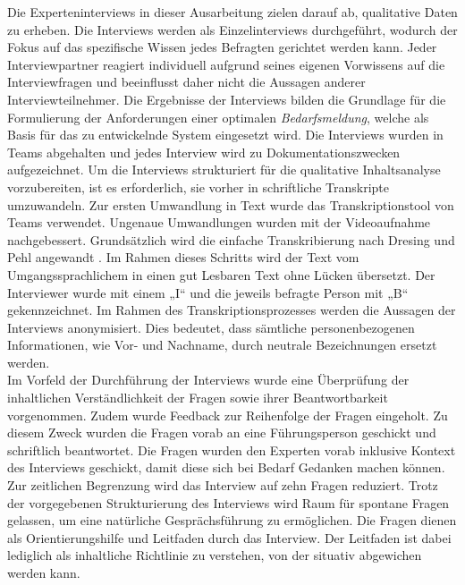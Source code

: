 Die Experteninterviews in dieser Ausarbeitung zielen darauf ab, qualitative Daten zu erheben. Die Interviews werden als Einzelinterviews durchgeführt, wodurch der Fokus auf das spezifische Wissen jedes Befragten gerichtet werden kann. Jeder Interviewpartner reagiert individuell aufgrund seines eigenen Vorwissens auf die Interviewfragen und beeinflusst daher nicht die Aussagen anderer Interviewteilnehmer. Die Ergebnisse der Interviews bilden die Grundlage für die Formulierung der Anforderungen einer optimalen \emph{Bedarfsmeldung}, welche als Basis für das zu entwickelnde System eingesetzt wird. Die Interviews wurden in Teams abgehalten und jedes Interview wird zu Dokumentationszwecken aufgezeichnet. Um die Interviews strukturiert für die qualitative Inhaltsanalyse vorzubereiten, ist es erforderlich, sie vorher in schriftliche Transkripte umzuwandeln. Zur ersten Umwandlung in Text wurde das Transkriptionstool von Teams verwendet. Ungenaue Umwandlungen wurden mit der Videoaufnahme nachgebessert. Grundsätzlich wird die einfache Transkribierung nach Dresing und Pehl angewandt \cite{dresing2015praxisbuch}. Im Rahmen dieses Schritts wird der Text vom Umgangssprachlichem in einen gut Lesbaren Text ohne Lücken übersetzt. Der Interviewer wurde mit einem „I“ und die jeweils befragte Person mit „B“ gekennzeichnet. Im Rahmen des Transkriptionsprozesses werden die Aussagen der Interviews anonymisiert. Dies bedeutet, dass sämtliche personenbezogenen Informationen, wie Vor- und Nachname, durch neutrale Bezeichnungen ersetzt werden.\\

Im Vorfeld der Durchführung der Interviews wurde eine Überprüfung der inhaltlichen Verständlichkeit der Fragen sowie ihrer Beantwortbarkeit vorgenommen. Zudem wurde Feedback zur Reihenfolge der Fragen eingeholt. Zu diesem Zweck wurden die Fragen vorab an eine Führungsperson geschickt und schriftlich beantwortet. Die Fragen wurden den Experten vorab inklusive Kontext des Interviews geschickt, damit diese sich bei Bedarf Gedanken machen können. Zur zeitlichen Begrenzung wird das Interview auf zehn Fragen reduziert. Trotz der vorgegebenen Strukturierung des Interviews wird Raum für spontane Fragen gelassen, um eine natürliche Gesprächsführung zu ermöglichen. Die Fragen dienen als Orientierungshilfe und Leitfaden durch das Interview. Der Leitfaden ist dabei lediglich als inhaltliche Richtlinie zu verstehen, von der situativ abgewichen werden kann.
